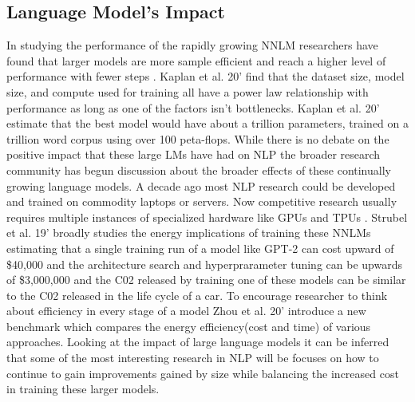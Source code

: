 \subsection{Language Model's Impact}
In studying the performance of the rapidly growing NNLM researchers have found that larger models are more sample efficient and reach a higher level of performance with fewer steps \cite{Kaplan2020ScalingLF}. Kaplan et al. 20' find that the dataset size, model size, and compute used for training all have a power law relationship with performance as long as one of the factors isn't bottlenecks. Kaplan et al. 20' estimate that the best model would have about a trillion parameters, trained on a trillion word corpus using over 100 peta-flops.
While there is no debate on the positive impact that these large LMs have had on NLP the broader research community has begun discussion about the broader effects of these continually growing language models. A decade ago most NLP research could be developed and trained on commodity laptops or servers. Now competitive research usually requires multiple instances of specialized hardware like GPUs and TPUs \cite{Strubell2019EnergyAP}. Strubel et al. 19' broadly studies the energy implications of training these NNLMs estimating that a single training run of a model like GPT-2 can cost upward of \$40,000 and the architecture search and hyperprarameter tuning can be upwards of \$3,000,000 and the C02 released by training one of these models can be similar to the C02 released in the life cycle of a car. To encourage researcher to think about efficiency in every stage of a model Zhou et al. 20' \cite{Zhou2020HULKAE} introduce a new benchmark which compares the energy efficiency(cost and time) of various approaches. Looking at the impact of large language models it can be inferred that some of the most interesting research in NLP will be focuses on how to continue to gain improvements gained by size while balancing the increased cost in training these larger models. \\
